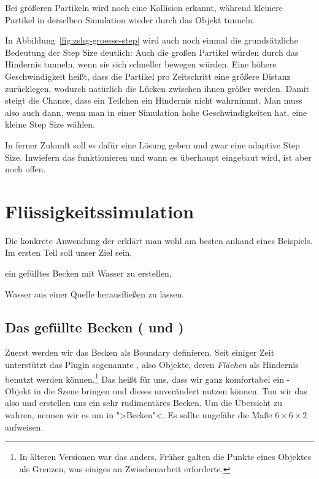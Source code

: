 \documentclass[10pt,DIV=14,a4paper]{scrartcl}
\begin{document}
{Bei größeren Partikeln wird noch eine Kollision erkannt, während
kleinere Partikel in derselben Simulation wieder durch das Objekt
tunneln.}

In Abbildung~\ref{fig:zshg-groesse-step} wird auch noch einmal die
grundsätzliche Bedeutung der Step Size deutlich: Auch die großen
Partikel würden durch das Hindernis tunneln, wenn sie sich schneller
bewegen würden. Eine höhere Geschwindigkeit heißt, dass die Partikel pro
Zeitschritt eine größere Distanz zurücklegen, wodurch natürlich die
Lücken zwischen ihnen größer werden. Damit steigt die Chance, dass ein
Teilchen ein Hindernis nicht wahrnimmt. Man muss also auch dann, wenn
man in einer Simulation hohe Geschwindigkeiten hat, eine kleine Step
Size wählen.

In ferner Zukunft soll es dafür eine Lösung geben und zwar eine adaptive
Step Size. Inwiefern das funktionieren und wann es überhaupt eingebaut
wird, ist aber noch offen.



\pagebreak
\section{Flüssigkeitssimulation}

Die konkrete Anwendung der \fluidsim erklärt man wohl am besten anhand
eines Beispiels. Im ersten Teil soll unser Ziel sein,
\enumA
	\item ein gefülltes Becken mit Wasser zu erstellen,
	\item Wasser aus einer Quelle herausfließen zu lassen.
\enumE

\subsection{Das gefüllte Becken ( und )}
Zuerst werden wir das Becken als Boundary definieren. Seit einiger Zeit
unterstützt das Plugin sogenannte , also Objekte,
deren \emph{Flächen} als Hindernis benutzt werden können.\footnote{In
älteren Versionen war das anders. Früher galten die Punkte eines
Objektes als Grenzen, was einiges an Zwischenarbeit erforderte.} Das
heißt für uns, dass wir ganz komfortabel ein \PolyMesh-Objekt in die
Szene bringen und dieses unverändert nutzen können. Tun wir das also und
erstellen uns ein sehr rudimentäres Becken. Um die Übersicht zu wahren,
nennen wir es um in ">Becken"<. Es sollte ungefähr die Maße
$6 \times 6 \times 2$ aufweisen.
\end{document}
